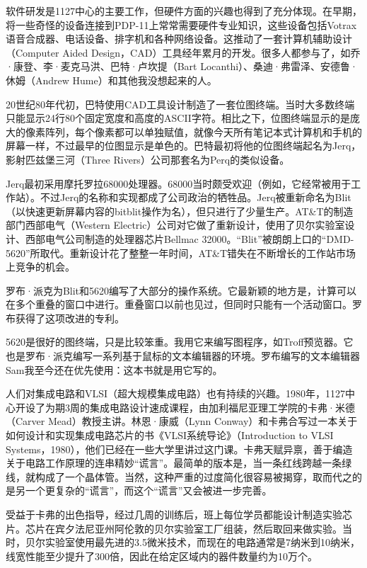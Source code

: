 \documentclass[a4paper,12pt,UTF8,twoside]{ctexbook}
\begin{document}
软件研发是1127中心的主要工作，但硬件方面的兴趣也得到了充分体现。在早期，将一些奇怪的设备连接到PDP-11上常常需要硬件专业知识，这些设备包括Votrax语音合成器、电话设备、排字机和各种网络设备。这推动了一套计算机辅助设计（Computer Aided Design，CAD）工具经年累月的开发。很多人都参与了，如乔·康登、李·麦克马洪、巴特·卢坎提（Bart Locanthi）、桑迪·弗雷泽、安德鲁·休姆（Andrew Hume）和其他我没想起来的人。

20世纪80年代初，巴特使用CAD工具设计制造了一套位图终端。当时大多数终端只能显示24行80个固定宽度和高度的ASCII字符。相比之下，位图终端显示的是庞大的像素阵列，每个像素都可以单独赋值，就像今天所有笔记本式计算机和手机的屏幕一样，不过最早的位图显示是单色的。巴特最初将他的位图终端起名为Jerq，影射匹兹堡三河（Three Rivers）公司那套名为Perq的类似设备。

Jerq最初采用摩托罗拉68000处理器。68000当时颇受欢迎（例如，它经常被用于工作站）。不过Jerq的名称和实现都成了公司政治的牺牲品。Jerq被重新命名为Blit（以快速更新屏幕内容的bitblit操作为名），但只进行了少量生产。AT\&T的制造部门西部电气（Western Electric）公司对它做了重新设计，使用了贝尔实验室设计、西部电气公司制造的处理器芯片Bellmac 32000。“Blit”被朗朗上口的“DMD-5620”所取代。重新设计花了整整一年时间，AT\&T错失在不断增长的工作站市场上竞争的机会。

罗布·派克为Blit和5620编写了大部分的操作系统。它最新颖的地方是，计算可以在多个重叠的窗口中进行。重叠窗口以前也见过，但同时只能有一个活动窗口。罗布获得了这项改进的专利。

5620是很好的图终端，只是比较笨重。我用它来编写图程序，如Troff预览器。它也是罗布·派克编写一系列基于鼠标的文本编辑器的环境。罗布编写的文本编辑器Sam我至今还在优先使用：这本书就是用它写的。

人们对集成电路和VLSI（超大规模集成电路）也有持续的兴趣。1980年，1127中心开设了为期3周的集成电路设计速成课程，由加利福尼亚理工学院的卡弗·米德（Carver Mead）教授主讲。林恩·康威（Lynn Conway）和卡弗合写过一本关于如何设计和实现集成电路芯片的书《VLSI系统导论》（Introduction to VLSI Systems，1980），他们已经在一些大学里讲过这门课。卡弗天赋异禀，善于编造关于电路工作原理的连串精妙“谎言”。最简单的版本是，当一条红线跨越一条绿线，就构成了一个晶体管。当然，这种严重的过度简化很容易被揭穿，取而代之的是另一个更复杂的“谎言”，而这个“谎言”又会被进一步完善。

受益于卡弗的出色指导，经过几周的训练后，班上每位学员都能设计制造实验芯片。芯片在宾夕法尼亚州阿伦敦的贝尔实验室工厂组装，然后取回来做实验。当时，贝尔实验室使用最先进的3.5微米技术，而现在的电路通常是7纳米到10纳米，线宽性能至少提升了300倍，因此在给定区域内的器件数量约为10万个。
\end{document}
